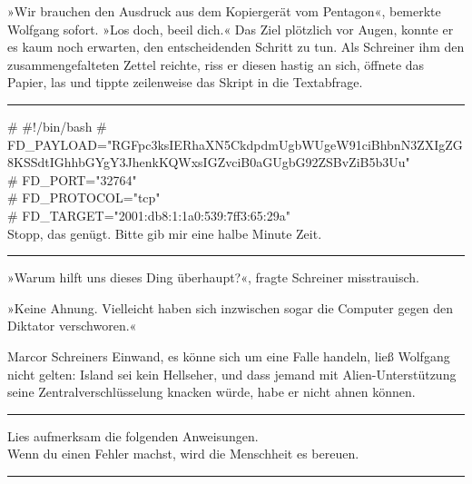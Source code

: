 »Wir brauchen den Ausdruck aus dem Kopiergerät vom Pentagon«, bemerkte Wolfgang sofort. »Los doch, beeil dich.« Das Ziel plötzlich vor Augen, konnte er es kaum noch erwarten, den entscheidenden Schritt zu tun. Als Schreiner ihm den zusammengefalteten Zettel reichte, riss er diesen hastig an sich, öffnete das Papier, las und tippte zeilenweise das Skript in die Textabfrage.

\noindent \parbox{\textwidth}{ \vspace{3ex} \hrule \vspace{3ex}

    \begin{tiny}
    \begin{ttfamily}

\noindent \# \#!/bin/bash
\noindent \# FD\_PAYLOAD="RGFpc3ksIERhaXN5CkdpdmUgbWUgeW91ciBhbnN3ZXIgZG8KSSdtIGhhbGYgY3JhenkKQWxsIGZvciB0aGUgbG92ZSBvZiB5b3Uu"\\
\noindent \# FD\_PORT="32764"\\
\noindent \# FD\_PROTOCOL="tcp"\\
\noindent \# FD\_TARGET="2001:db8:1:1a0:539:7ff3:65:29a"\\
\noindent Stopp, das genügt. Bitte gib mir eine halbe Minute Zeit.

    \end{ttfamily}
    \end{tiny}

\vspace{3ex} \hrule \vspace{3ex} }

»Warum hilft uns dieses Ding überhaupt?«, fragte Schreiner misstrauisch.

»Keine Ahnung. Vielleicht haben sich inzwischen sogar die Computer gegen den Diktator verschworen.«

Marcor Schreiners Einwand, es könne sich um eine Falle handeln, ließ Wolfgang nicht gelten: Island sei kein Hellseher, und dass jemand mit Alien-Unterstützung seine Zentralverschlüsselung knacken würde, habe er nicht ahnen können.

\noindent \parbox{\textwidth}{ \vspace{3ex} \hrule \vspace{3ex}

    \begin{tiny}
    \begin{ttfamily}

\noindent Lies aufmerksam die folgenden Anweisungen.\\
\noindent Wenn du einen Fehler machst, wird die Menschheit es bereuen.

    \end{ttfamily}
    \end{tiny}

\vspace{3ex} \hrule \vspace{3ex} }


